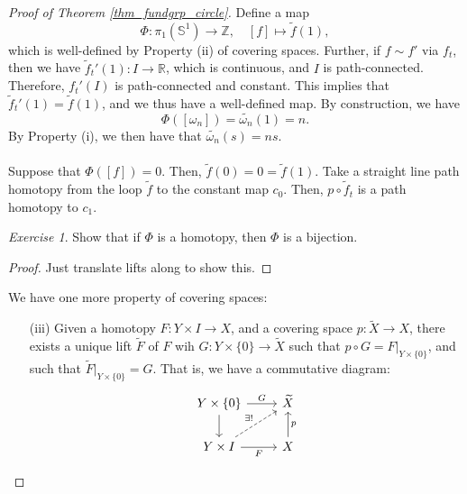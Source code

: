 \documentclass[a4paper]{report}
\theoremstyle{definition}
\theoremstyle{remark}
\theoremstyle{proposition}
\theoremstyle{conjecture}
\theoremstyle{lemma}
\theoremstyle{corollary}
\theoremstyle{exercise}
\newtheorem{exercise}{Exercise}
\begin{document}
\begin{proof}[Proof of Theorem \ref{thm_fundgrp_circle}]
    Define a map 
    $$\Phi : \pi_1(\mathbb{S}^1) \longrightarrow \mathbb{Z},\quad [f]\longmapsto \widetilde{f}(1),$$
    which is well-defined by Property (ii) of covering spaces. Further, if $f \sim f'$ via $f_t$, then we have 
    $\widetilde{f}_t'(1) : I \to \mathbb{R}$, which is continuous, and $I$ is path-connected. Therefore, $f_t'(I)$ is path-connected and constant.
    This implies that 
    $\widetilde{f}_t'(1) = \widetilde{f}(1)$,
    and we thus have a well-defined map.
    By construction, we have $$\Phi([\omega_n]) = \widetilde{\omega_n}(1) = n.$$
    By Property (i), we then have that $\widetilde{\omega_n}(s) = ns$.\\\\
    Suppose that $\Phi([f]) = 0$. Then, 
    $\widetilde{f}(0) = 0 = \widetilde{f}(1)$.
    Take a straight line path homotopy from the loop $\widetilde{f}$ to the constant map $c_0$. Then, $p\circ \widetilde{f}_t$  is a path homotopy to $c_1$.
    \begin{exercise}
        Show that if $\Phi$ is a homotopy, then $\Phi$ is a bijection.
    \end{exercise}
    \begin{proof}
        Just translate lifts along to show this.
    \end{proof}

We have one more property of covering spaces:
\begin{itemize}
    \item[(iii)] 
    Given a homotopy $F : Y \times I \to X$, and a covering space $p : \widetilde{X} \to X$,
    there exists a unique lift $\widetilde{F}$ of $F$ wih $G : Y \times \lbrace 0 \rbrace \to \widetilde{X}$ 
    such that $p\circ G = F\vert_{Y \times \lbrace 0 \rbrace}$, and
    such that $\widetilde{F}\vert_{Y \times \lbrace 0 \rbrace} = G$.
    That is, we have a commutative diagram:
    $$\begin{tikzcd}
Y \times \lbrace 0 \rbrace \arrow[r, "G"] \arrow[d]       & \widetilde{X}     \\
Y\times I \arrow[r, "F"'] \arrow[ru, "\exists !", dashed] & X \arrow[u, "p"']
\end{tikzcd}$$
\end{itemize}


\end{proof}
\end{document}
